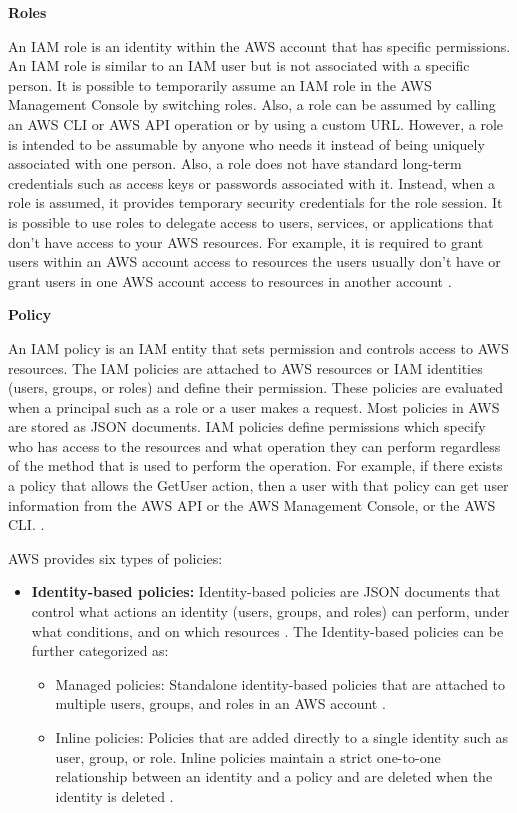 \textbf{Roles}
\par An IAM role is an identity within the AWS account that has specific permissions. An IAM role is similar to an IAM user but is not associated with a specific person. It is possible to temporarily assume an IAM role in the AWS Management Console by switching roles. Also, a role can be assumed by calling an AWS CLI or AWS API operation or by using a custom URL. However, a role is intended to be assumable by anyone who needs it instead of being uniquely associated with one person. Also, a role does not have standard long-term credentials such as access keys or passwords associated with it. Instead, when a role is assumed, it provides temporary security credentials for the role session. It is possible to use roles to delegate access to users, services, or applications that don't have access to your AWS resources. For example, it is required to grant users within an AWS account access to resources the users usually don’t have or grant users in one AWS account access to resources in another account \cite{25}.

\textbf{Policy}

\par An IAM policy is an IAM entity that sets permission and controls access to AWS resources. The IAM policies are
attached to AWS resources or IAM identities (users, groups, or roles) and define their permission. These policies are
evaluated when a principal such as a role or a user makes a request. Most policies in AWS are stored as JSON
documents. IAM policies define permissions which specify who has access to the resources and what operation they can
perform regardless of the method that is used to perform the operation. For example, if there exists a policy that allows the GetUser action, then a user with that policy can get user information from the AWS API or the AWS Management Console, or the AWS CLI. \cite{14}.

\par AWS provides six types of policies:

\begin{itemize}
    \item \textbf{Identity-based policies:} Identity-based policies are JSON documents that control what actions an
    identity
    (users, groups, and roles) can perform, under what conditions, and on which resources \cite{25}. The Identity-based policies can be further categorized as:
    \begin{itemize}
        \item Managed policies: Standalone identity-based policies that are attached to multiple users, groups, and
        roles in an AWS account \cite{25}.
    \end{itemize}
    \begin{itemize}
        \item Inline policies:  Policies that are added directly to a single identity such as user, group, or role.
        Inline policies maintain a strict one-to-one relationship between an identity and a policy and are deleted when the identity is deleted \cite{25}.
    \end{itemize}
\end{itemize}

